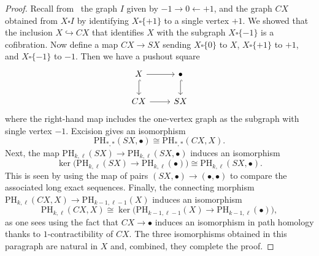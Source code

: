 \documentclass[a4paper, 11 pt, oneside, reqno]{amsart}
\numberwithin{lemma}{section}
\theoremstyle{definition}
\newcommand{\PH}{\mathrm{PH}}
\begin{document}
\begin{proof}
    Recall from~ the graph
    $I$  given by $-1\to 0\leftarrow +1$,
    and the graph $CX$ obtained from $X\square I$ by identifying
    $X\square\{+1\}$ to a single vertex $+1$.
    We  showed that the inclusion $X\hookrightarrow CX$ 
    that identifies $X$ with the subgraph $X\square\{-1\}$ 
    is a cofibration.
    Now define a map $CX\to SX$ sending $X\square\{0\}$ to $X$,
    $X\square\{+1\}$ to $+1$, and $X\square\{-1\}$ to $-1$.
    Then we have a pushout square
    \[
    \begin{tikzcd}
        X \arrow{r}{} \arrow[hook]{d} & \bullet \arrow[hook]{d}{} \\
        CX \arrow[r] & SX
    \end{tikzcd}
    \]
    where the right-hand map includes the one-vertex graph
    as the subgraph with single vertex $-1$.
    Excision gives an isomorphism
    \[
        \PH_{\ast,\ast}(SX,\bullet)
        \cong
        \PH_{\ast,\ast}(CX,X).
    \]
    Next, the map $\PH_{k,\ell}(SX)\to\PH_{k,\ell}(SX,\bullet)$
    induces an isomorphism
    \[
        \ker\bigl(\PH_{k,\ell}(SX)\to\PH_{k,\ell}(\bullet)\bigr)
        \cong
        \PH_{k,\ell}(SX,\bullet).
    \]
    This is seen by using the map of pairs 
    $(SX,\bullet)\to(\bullet,\bullet)$
    to compare the associated long exact sequences.
    Finally,
    the connecting morphism $\PH_{k,\ell}(CX,X)\to\PH_{k-1,\ell-1}(X)$
    induces an isomorphism
    \[     
        \PH_{k,\ell}(CX,X)
        \cong
        \ker\bigl(\PH_{k-1,\ell-1}(X)\to\PH_{k-1,\ell}(\bullet)\bigr),
    \]
    as one sees using the fact that $CX\to\bullet$ induces an 
    isomorphism in path homology thanks to $1$-contractibility
    of $CX$.
    The three isomorphisms obtained in this paragraph are natural
    in $X$ and, combined, they complete the proof.
\end{proof}
\end{document}
